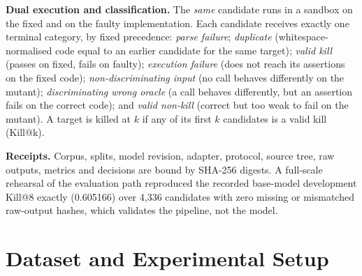 \documentclass[conference,a4paper]{IEEEtran}
\makeatletter
\newcommand{\killk}[1]{Kill@#1}
\makeatother
\begin{document}
\textbf{Dual execution and classification.} The \emph{same} candidate runs in a
sandbox on the fixed and on the faulty implementation. Each candidate receives exactly
one terminal category, by fixed precedence: \emph{parse failure};
\emph{duplicate} (whitespace-normalised code equal to an earlier candidate for the same
target); \emph{valid kill} (passes on fixed, fails on faulty); \emph{execution
failure} (does not reach its assertions on the fixed code); \emph{non-discriminating
input} (no call behaves differently on the mutant); \emph{discriminating wrong oracle}
(a call behaves differently, but an assertion fails on the correct code); and
\emph{valid non-kill} (correct but too weak to fail on the mutant). A target is
killed at $k$ if any of its first $k$ candidates is a valid kill (\killk{k}).

\textbf{Receipts.} Corpus, splits, model revision, adapter, protocol, source tree,
raw outputs, metrics and decisions are bound by SHA-256 digests. A full-scale
rehearsal of the evaluation path reproduced the recorded base-model development
\killk{8} exactly (0.605166) over 4,336 candidates with zero missing or mismatched
raw-output hashes, which validates the pipeline, not the model.

\section{Dataset and Experimental Setup}
\end{document}
